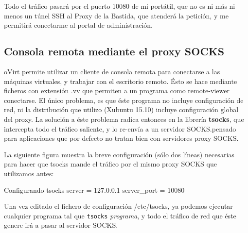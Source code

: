 Todo el tráfico pasará por el puerto 10080 de mi portátil, que no es ni más ni menos un túnel SSH al Proxy de la Bastida, que atenderá la petición, y me permitirá conectarme al portal de administración.

\subsection{Consola remota mediante el proxy SOCKS}
\label{subsec:consola}

oVirt permite utilizar un cliente de consola remota para conectarse a las máquinas virtuales, y trabajar con el escritorio remoto. Ésto se hace mediante ficheros con extensión $.$vv que permiten a un programa como remote-viewer conectarse. El único problema, es que éste programa no incluye configuración de red, ni la distribución que utilizo (Xubuntu 15.10) incluye configuración global del proxy. La solución a éste problema radica entonces en la librería \textbf{tsocks}, que intercepta todo el tráfico saliente, y lo re-envía a un servidor SOCKS. pensado para aplicaciones que por defecto no tratan bien con servidores proxy SOCKS.

La siguiente figura muestra la breve configuración (sólo dos líneas) necesarias para hacer que tsocks mande el tráfico por el mismo proxy SOCKS que utilizamos antes:

\begin{TMterminal}{}{}{Configurando tsocks}
  server      = 127.0.0.1
  server_port = 10080
\end{TMterminal}

Una vez editado el fichero de configuración /etc/tsocks, ya podemos ejecutar cualquier programa tal que \texttt{tsocks} \emph{programa}, y todo el tráfico de red que éste genere irá a pasar al servidor SOCKS.







